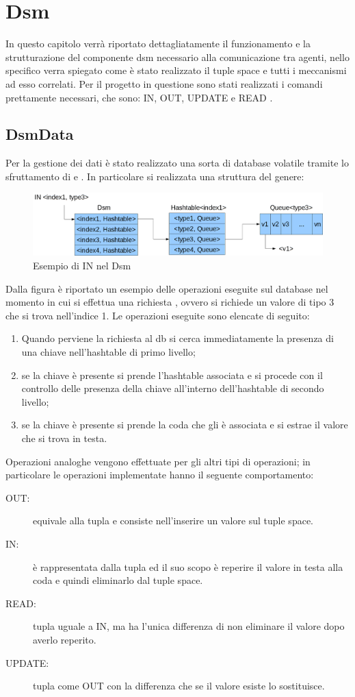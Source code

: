 \chapter{Dsm}
In questo capitolo verrà riportato dettagliatamente il funzionamento e la strutturazione del componente dsm necessario alla comunicazione tra agenti, nello specifico verra spiegato come è stato realizzato il tuple space e tutti i meccanismi ad esso correlati.
Per il progetto in questione sono stati realizzati i comandi prettamente necessari, che sono: IN, OUT, UPDATE e READ \cite{linda}.
\section{DsmData}
Per la gestione dei dati è stato realizzato una sorta di database volatile tramite lo sfruttamento di  e . In particolare si realizzata una struttura del genere:
\begin{figure}[H]
\begin{center}
\includegraphics[scale=0.3]{etc/dsm.png}
\caption{Esempio di IN nel Dsm}
\label{dsm1}
\end{center}
\end{figure}
Dalla figura è riportato un esempio delle operazioni eseguite sul database nel momento in cui si effettua una richiesta , ovvero si richiede un valore di tipo 3 che si trova nell'indice 1. Le operazioni eseguite sono elencate di seguito:
\begin{enumerate}
	\item Quando perviene la richiesta al db si cerca immediatamente la presenza di una chiave  nell'hashtable di primo livello;
	\item se la chiave è presente si prende l'hashtable associata e si procede con il controllo delle presenza della chiave  all'interno dell'hashtable di secondo livello;
	\item se la chiave è presente si prende la coda che gli è associata e si estrae il valore che si trova in testa.
\end{enumerate}
Operazioni analoghe vengono effettuate per gli altri tipi di operazioni; in particolare le operazioni implementate hanno il seguente comportamento:
\begin{description}
	\item[OUT:] equivale alla tupla  e consiste nell'inserire un valore sul tuple space.
	\item[IN:] è rappresentata dalla tupla  ed il suo scopo è reperire il valore in testa alla coda e quindi eliminarlo dal tuple space.
	\item[READ:] tupla uguale a IN, ma ha l'unica differenza di non eliminare il valore dopo averlo reperito.
	\item[UPDATE:] tupla come OUT con la differenza che se il valore esiste lo sostituisce.
\end{description}
